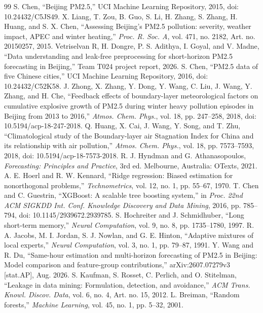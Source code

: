 \documentclass[conference]{IEEEtran}
\begin{document}
\begin{thebibliography}{99}
 S. Chen, ``Beijing PM2.5,'' UCI Machine Learning Repository, 2015, doi: 10.24432/C5JS49.
 X. Liang, T. Zou, B. Guo, S. Li, H. Zhang, S. Zhang, H. Huang, and S. X. Chen, ``Assessing Beijing's PM2.5 pollution: severity, weather impact, APEC and winter heating,'' \emph{Proc. R. Soc. A}, vol. 471, no. 2182, Art. no. 20150257, 2015.
 Vetriselvan R, H. Dongre, P. S. Adithya, I. Goyal, and V. Madne, ``Data understanding and leak-free preprocessing for short-horizon PM2.5 forecasting in Beijing,'' Team T024 project report, 2026.
 S. Chen, ``PM2.5 data of five Chinese cities,'' UCI Machine Learning Repository, 2016, doi: 10.24432/C52K58.
 J. Zhong, X. Zhang, Y. Dong, Y. Wang, C. Liu, J. Wang, Y. Zhang, and H. Che, ``Feedback effects of boundary-layer meteorological factors on cumulative explosive growth of PM2.5 during winter heavy pollution episodes in Beijing from 2013 to 2016,'' \emph{Atmos. Chem. Phys.}, vol. 18, pp. 247--258, 2018, doi: 10.5194/acp-18-247-2018.
 Q. Huang, X. Cai, J. Wang, Y. Song, and T. Zhu, ``Climatological study of the Boundary-layer air Stagnation Index for China and its relationship with air pollution,'' \emph{Atmos. Chem. Phys.}, vol. 18, pp. 7573--7593, 2018, doi: 10.5194/acp-18-7573-2018.
 R. J. Hyndman and G. Athanasopoulos, \emph{Forecasting: Principles and Practice}, 3rd ed. Melbourne, Australia: OTexts, 2021.
 A. E. Hoerl and R. W. Kennard, ``Ridge regression: Biased estimation for nonorthogonal problems,'' \emph{Technometrics}, vol. 12, no. 1, pp. 55--67, 1970.
 T. Chen and C. Guestrin, ``XGBoost: A scalable tree boosting system,'' in \emph{Proc. 22nd ACM SIGKDD Int. Conf. Knowledge Discovery and Data Mining}, 2016, pp. 785--794, doi: 10.1145/2939672.2939785.
 S. Hochreiter and J. Schmidhuber, ``Long short-term memory,'' \emph{Neural Computation}, vol. 9, no. 8, pp. 1735--1780, 1997.
 R. A. Jacobs, M. I. Jordan, S. J. Nowlan, and G. E. Hinton, ``Adaptive mixtures of local experts,'' \emph{Neural Computation}, vol. 3, no. 1, pp. 79--87, 1991.
 Y. Wang and R. Du, ``Same-hour estimation and multi-horizon forecasting of PM2.5 in Beijing: Model comparison and feature-group contributions,'' arXiv:2607.07279v3 [stat.AP], Aug. 2026.
 S. Kaufman, S. Rosset, C. Perlich, and O. Stitelman, ``Leakage in data mining: Formulation, detection, and avoidance,'' \emph{ACM Trans. Knowl. Discov. Data}, vol. 6, no. 4, Art. no. 15, 2012.
 L. Breiman, ``Random forests,'' \emph{Machine Learning}, vol. 45, no. 1, pp. 5--32, 2001.
\end{thebibliography}
\end{document}
